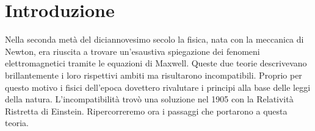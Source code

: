 \chapter{Introduzione}
Nella seconda metà del diciannovesimo secolo la fisica, nata con la meccanica di Newton, 
era riuscita a trovare un'esaustiva spiegazione dei fenomeni elettromagnetici tramite le 
equazioni di Maxwell. Queste due teorie descrivevano brillantemente i loro rispettivi ambiti 
ma risultarono incompatibili. Proprio per questo motivo i fisici dell'epoca dovettero rivalutare 
i principi alla base delle leggi della natura. L'incompatibilità trovò una soluzione nel 1905 con 
la Relatività Ristretta di Einstein. Ripercorreremo ora i passaggi che portarono a questa teoria.


